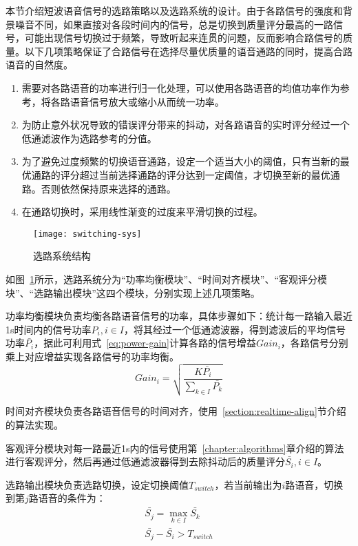 本节介绍短波语音信号的选路策略以及选路系统的设计。由于各路信号的强度和背景噪音不同，如果直接对各段时间内的信号，总是切换到质量评分最高的一路信号，可能出现信号切换过于频繁，导致听起来连贯的问题，反而影响合路信号的质量。以下几项策略保证了合路信号在选择尽量优质量的语音通路的同时，提高合路语音的自然度。

\begin{enumerate}
    \item 需要对各路语音的功率进行归一化处理，可以使用各路语音的均值功率作为参考，将各路语音信号放大或缩小从而统一功率。
    \item 为防止意外状况导致的错误评分带来的抖动，对各路语音的实时评分经过一个低通滤波作为选路参考的分值。
    \item 为了避免过度频繁的切换语音通路，设定一个适当大小的阈值，只有当新的最优通路的评分超过当前选择通路的评分达到一定阈值，才切换至新的最优通路。否则依然保持原来选择的通路。 
    \item 在通路切换时，采用线性渐变的过度来平滑切换的过程。
\end{enumerate}

\begin{figure}
\centering
\texttt{[image: switching-sys]}
\caption{选路系统结构\label{fig:switching-sys}}
\end{figure}

如图~\ref{fig:switching-sys}所示，选路系统分为“功率均衡模块”、“时间对齐模块”、“客观评分模块”、“选路输出模块”这四个模块，分别实现上述几项策略。

功率均衡模块负责均衡各路语音信号的功率，具体步骤如下：统计每一路输入最近1s时间内的信号功率$P_i, i \in I$，将其经过一个低通滤波器，得到滤波后的平均信号功率$\bar{P_i}$，据此可利用式~\ref{eq:power-gain}计算各路的信号增益$Gain_i$，各路信号分别乘上对应增益实现各路信号的功率均衡。
\begin{equation}\label{eq:power-gain}
Gain_i = \sqrt{\frac {K\bar{P_i}} {\sum_{k \in I}{\bar{P_k}}} }
\end{equation}

时间对齐模块负责各路语音信号的时间对齐，使用~\ref{section:realtime-align}节介绍的算法实现。

客观评分模块对每一路最近1s内的信号使用第~\ref{chapter:algorithms}章介绍的算法进行客观评分，然后再通过低通滤波器得到去除抖动后的质量评分$\bar{S_i}, i \in I$。

选路输出模块负责选路切换，设定切换阈值$T_{switch}$，若当前输出为$i$路语音，切换到第$j$路语音的条件为：
\begin{equation}
\begin{array}{l}
\bar{S_j} = \max\limits_{k \in I} \bar{S_k} \\
\bar{S_j} - \bar{S_i} > T_{switch}
\end{array}
\end{equation}

